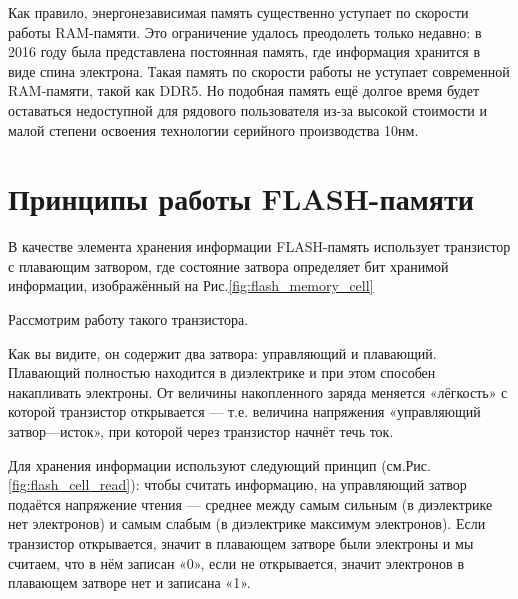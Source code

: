 \documentclass[a5paper, DIV=14, headings=openany, twoside=true,fontsize=10pt, titlepage]{scrreprt}
\newcommand{\quotes}[1]{«#1»}
\newcommand{\eng}[1]{\foreignlanguage{english}{#1}}
\begin{document}
\par{Как правило, энергонезависимая память существенно уступает по скорости работы \eng{RAM}-памяти. Это ограничение удалось преодолеть только недавно: в 2016 году была представлена постоянная память, где информация хранится в виде спина электрона. Такая память по скорости работы не уступает современной \eng{RAM}-памяти, такой как \eng{DDR5}. Но подобная память ещё долгое время будет оставаться недоступной для рядового пользователя из-за высокой стоимости и малой степени освоения технологии серийного производства 10нм.}

\section{Принципы работы \eng{FLASH}-памяти}

\par{В качестве элемента хранения информации \eng{FLASH}-память использует транзистор с плавающим затвором, где состояние затвора определяет бит хранимой информации, изображённый на Рис.\ref{fig:flash_memory_cell}}

% 

\par{Рассмотрим работу такого транзистора.}

\par{Как вы видите, он содержит два затвора: управляющий и плавающий. Плавающий полностью находится в диэлектрике и при этом способен накапливать электроны. От величины накопленного заряда меняется \quotes{лёгкость} с которой транзистор открывается --- т.е. величина напряжения \quotes{управляющий затвор---исток}, при которой через транзистор начнёт течь ток.}

\par{Для хранения информации используют следующий принцип (см.Рис.\ref{fig:flash_cell_read}): чтобы считать информацию, на управляющий затвор подаётся напряжение чтения --- среднее между самым сильным (в диэлектрике нет электронов) и самым слабым (в диэлектрике максимум электронов). Если транзистор открывается, значит в плавающем затворе были электроны и мы считаем, что в нём записан \quotes{0}, если не открывается, значит электронов в плавающем затворе нет и записана \quotes{1}.}

% 
\end{document}
